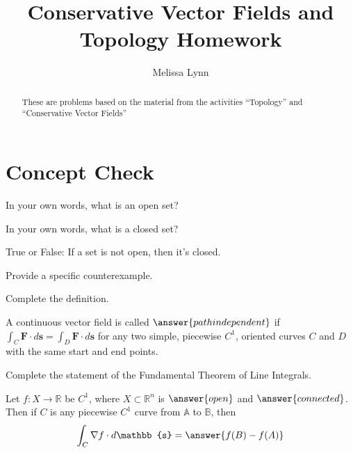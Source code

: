 \documentclass{ximera}
\title{Conservative Vector Fields and Topology Homework}
\author{Melissa Lynn}
\begin{document}
  
\begin{abstract}  
These are problems based on the material from the activities ``Topology'' and ``Conservative Vector Fields''
\end{abstract}  
\maketitle

\section{Concept Check}

\begin{problem}
In your own words, what is an open set?
\begin{freeResponse}
\end{freeResponse}
\end{problem}

\begin{problem}
In your own words, what is a closed set?
\begin{freeResponse}
\end{freeResponse}
\end{problem}

\begin{problem}
True or False: If a set is not open, then it's closed.
\begin{multipleChoice}
\end{multipleChoice}
\begin{problem}
Provide a specific counterexample.
\begin{freeResponse}
\end{freeResponse}
\end{problem}
\end{problem}

\begin{problem}
Complete the definition.

A continuous vector field is called $\answer{path independent}$ if $\int_C\mathbf{F}\cdot d\mathbf{s} = \int_D\mathbf{F}\cdot d\mathbf{s}$ for any two simple, piecewise $C^1$, oriented curves $C$ and $D$ with the same start and end points.
\end{problem}

\begin{problem}
Complete the statement of the Fundamental Theorem of Line Integrals.

Let $f:X\rightarrow\mathbb{R}$ be $C^1$, where $X\subset\mathbb{R}^n$ is $\answer{open}$ and $\answer{connected}$. Then if $C$ is any piecewise $C^1$ curve from $\mathbb{A}$ to $\mathbb{B}$, then
\[
\int_C\nabla f\cdot d\mathbb{s} = \answer{f(B)-f(A)}
\]
\end{problem}
\end{document}
